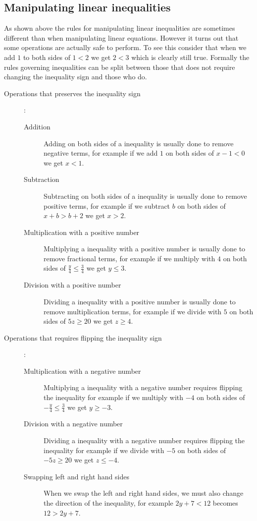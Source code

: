 \subsection{Manipulating linear inequalities}
As shown above the rules for manipulating linear inequalities are sometimes different than when manipulating linear equations. However it turns out that some operations are actually safe to perform. To see this consider that when we add $1$ to both sides of $1 < 2$ we get $2 < 3$ which is clearly still true. Formally the rules governing inequalities can be split between those that does not require changing the inequality sign and those who do.
\begin{description}
\item [Operations that preserves the inequality sign]:
\begin{description}
\item [Addition] Adding on both sides of a inequality is usually done to remove negative terms, for example if we add $1$ on both sides of $x - 1 < 0$ we get $x < 1$.
\item [Subtraction] Subtracting on both sides of a inequality is usually done to remove positive terms, for example if we subtract $b$ on both sides of $x + b > b + 2$ we get $x > 2$.
\item [Multiplication with a positive number] Multiplying a inequality with a positive number is usually done to remove fractional terms, for example if we multiply with $4$ on both sides of
$\frac{y}{4} \leq \frac{3}{4}$ we get $y \leq 3$.
\item [Division with a positive number] Dividing a inequality with a positive number is usually done to remove multiplication terms, for example if we divide with $5$ on both sides of $5z \geq 20$ we get $z \geq 4$.
\end{description}
\item [Operations that requires flipping the inequality sign]:
\begin{description}
\item [Multiplication with a negative number] Multiplying a inequality with a negative number requires flipping the inequality for example if we multiply with $-4$ on both sides of $-\frac{y}{4} \leq \frac{3}{4}$ we get $y \geq -3$.
\item [Division with a negative number]
Dividing a inequality with a negative number requires flipping the inequality for example if we divide with $-5$ on both sides of $-5z \geq 20$ we get $z \leq -4$.
\item [Swapping left and right hand sides] When we swap the left and right hand sides, we must also change the direction of the inequality, for example $2y+7 < 12$ becomes $12 > 2y+7$.
\end{description}
\end{description}
